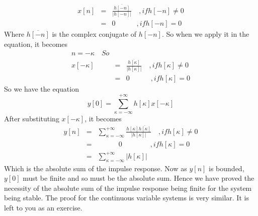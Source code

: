 \begin{eqnarray*}
x[n]&=&\frac{\overline{h[-n]}}{|h[-n]|}\quad , if h[-n]\neq 0 \\
       &=&0                         \quad   \quad \quad, if h[-n]=0
\end{eqnarray*}
Where $\overline{h[-n]}$ is the complex conjugate of $h[-n]$. So when we apply it in the equation, it becomes
\begin{eqnarray*}
n=-\kappa\quad So\\
x[-\kappa]&=&\frac{\overline{h[\kappa]}}{|h[\kappa]|}\quad , if h[\kappa]\neq 0 \\
       &=&0                         \quad   \quad \quad, if h[\kappa]=0
\end{eqnarray*}
So we have the equation
\begin{equation}
y[0]=\sum_{\kappa=-\infty}^{+\infty} h[\kappa]x[-\kappa] \nonumber
\end{equation}
After substituting $x[-\kappa]$, it becomes
\begin{eqnarray*}
y[n]&=&\sum_{\kappa=-\infty}^{+\infty}\frac{h[\kappa]\overline{h[\kappa]}}{|h[\kappa]|}\quad , if h[\kappa]\neq 0 \\
       &=&\quad\quad\quad0                         \quad \quad  \quad \quad, if h[\kappa]=0\\
       &=&\sum_{\kappa=-\infty}^{+\infty}|h[\kappa]|
\end{eqnarray*}
Which is the absolute sum of the impulse response. Now as $y[n]$ is bounded, $y[0]$ must be finite and so must be the absolute  sum. Hence we have proved the necessity of the absolute sum of the impulse response being finite for the system being stable. The proof for the continuous variable systems is very similar. It is left to you as an exercise.
